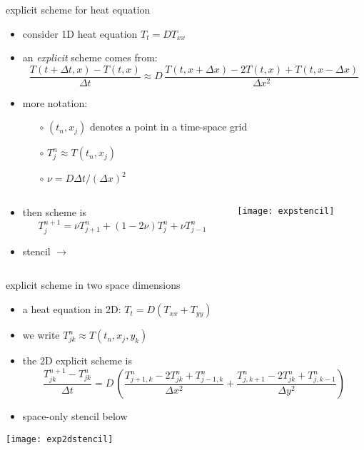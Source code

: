 \begin{frame}{explicit scheme for heat equation}

\begin{itemize}
\item consider 1D heat equation $T_t = D T_{xx}$
\item an \emph{explicit} scheme comes from:
\small
	$$\frac{T(t+\Delta t,x) - T(t,x)}{\Delta t} \approx D\,\frac{T(t,x+\Delta x) - 2 T(t,x) + T(t,x-\Delta x)}{\Delta x^2}$$
\normalsize
\item more notation:
  \begin{itemize}
  \item[$\circ$] $(t_n,x_j)$ denotes a point in a time-space grid
  \item[$\circ$] $T_j^n \approx T(t_n,x_j)$
  \item[$\circ$] $\nu = D \Delta t / (\Delta x)^2$
  \end{itemize}
\end{itemize}

\begin{columns}
\begin{column}{0.6\textwidth}
\begin{itemize}
\item then scheme is
	$$T_j^{n+1} = \nu T_{j+1}^n + (1 - 2 \nu) T_j^n + \nu T_{j-1}^n$$
\item stencil \large $\to$ \normalsize
\end{itemize}
\end{column}
\begin{column}{0.4\textwidth}
\hspace{5mm}\texttt{[image: expstencil]}
\end{column}
\end{columns}
\end{frame}


\begin{frame}{explicit scheme in two space dimensions}

\begin{itemize}
\item a heat equation in 2D: \quad $T_t = D(T_{xx} + T_{yy})$
\item we write $T_{jk}^n \approx T(t_n,x_j,y_k)$
\item the 2D explicit scheme is
\small
	$$\frac{T_{jk}^{n+1} - T_{jk}^n}{\Delta t} = D\,\left(\frac{T_{j+1,k}^n - 2 T_{jk}^n + T_{j-1,k}^n}{\Delta x^2} + \frac{T_{j,k+1}^n - 2 T_{jk}^n + T_{j,k-1}^n}{\Delta y^2}\right)$$
\normalsize
\item space-only stencil below
\end{itemize}

\bigskip
\begin{center}
\texttt{[image: exp2dstencil]}
\end{center}
\end{frame}


